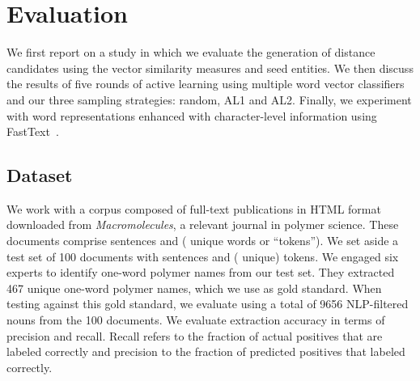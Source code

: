 \section{Evaluation}
\label{sect:results}
We first report on a study in which we evaluate the generation of distance candidates using the vector similarity measures and seed entities. 
We then discuss the results of five rounds of active learning using multiple word vector classifiers and our three sampling strategies: random, AL1 and AL2.
Finally, we experiment with word representations enhanced with character-level information using FastText~\cite{bojanowski2016enriching,joulin2016bag}.

\subsection{Dataset}
We work with a corpus composed of  full-text publications in HTML format downloaded from \textit{Macromolecules}, a relevant journal in polymer science.
These documents comprise  sentences and  ( unique words or ``tokens'').
We set aside a test set of  100 documents with   sentences and  ( unique) tokens. 
We engaged six experts to identify one-word polymer names from our test set.
They extracted 467 unique one-word polymer names, which we use as gold standard.
When testing against this gold standard, we evaluate using a total of 9656 NLP-filtered nouns from the 100 documents.
We evaluate extraction accuracy in terms of precision and recall.
Recall refers to the fraction of actual positives that
are labeled correctly and precision to the fraction of predicted
positives that labeled correctly.

